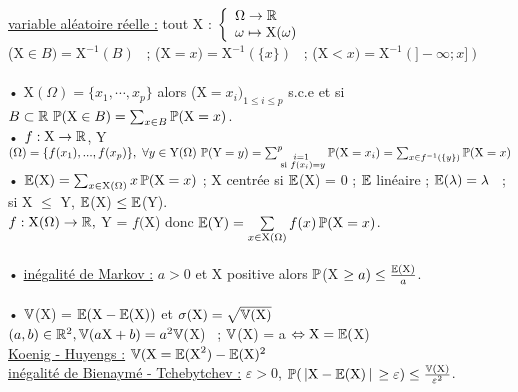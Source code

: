 \documentclass[12 pt]{exampleclass}
\begin{document}
\begin{flushleft}
\begin{doublespace}

	\underline{variable aléatoire réelle :} tout X : $\left\{\begin{array}{ll} \Omega \rightarrow \mathbb{R} \\ \omega \mapsto \text{X}(\omega) \end{array} \right.$\\
	(X$\in B ) = \text{X}^{-1}(B)$ \ ; (X$ = x) = \text{X}^{- 1}(\{x\})$ \ ; (X$ < x) = \text{X}^{- 1} (] - \infty ; x])$\\
	\text{ }\\
	• X$(\Omega) = \{ x_1,\cdots, x_p\}$ alors (X$ = x_i)_{1\leq i \leq p}$ s.c.e et si $B\subset \mathbb{R} \ \mathbb{P}(\text{X}\in B) = \sum_{x\in B} \mathbb{P}(\text{X} = x)$.\\
	• $f : \text{X} \rightarrow \mathbb{R}$, Y$(\Omega) = \{ f(x_1),..., f(x_p)\}, \ \forall y\in \text{Y}(\Omega) \ \mathbb{P}(\text{Y} = y) = \sum_{\begin{subarray}{l} \text{\quad \  \ } i = 1 \\ \text{ si } f(x_i) =y \end{subarray}}^p \mathbb{P}(\text{X} = x_i) = \sum_{x\in f^{- 1}(\{y\})} \mathbb{P}(\text{X} = x)$\\
	• $\mathbb{E}(\text{X}) = \sum_{x\in \text{X}(\Omega)} x \, \mathbb{P}(\text{X} = x)$ ; X centrée si $\mathbb{E}$(X) = 0 ; $\mathbb{E}$ linéaire ; $\mathbb{E}(\lambda) = \lambda$ \ ; si X $\leq$ Y, $\mathbb{E}$(X) $\leq \mathbb{E}$(Y).\\
	$f : \text{X}(\Omega) \rightarrow \mathbb{R},$ Y = $f($X) donc $\mathbb{E}(\text{Y}) = \sum\limits_{x\in \text{X}(\Omega)} f(x) \, \mathbb{P}(\text{X} = x)$.\\
	
	\text{ }\\
	• \underline{inégalité de Markov :} $a>0$ et X positive alors $\mathbb{P}$(X $\geq a) \leq \frac{\mathbb{E}(\text{X})}{a}$.\\
	
	\text{ }\\
	• $\mathbb{V}$(X) = $\mathbb{E} \text{(X} - \mathbb{E}(\text{X}))$ et $\sigma(\text{X}) = \sqrt{\mathbb{V}(\text{X})}$\\
	$(a,b)\in\mathbb{R}^2, \mathbb{V}(a\text{X} +  b) = a^2 \mathbb{V}($X) \ ; $\mathbb{V}$(X) = a $\Leftrightarrow \text{X} = \mathbb{E}($X) \\ \underline{Koenig - Huyengs :} $\mathbb{V}(\text{X} = \mathbb{E}(\text{X}^2) - \mathbb{E}(\text{X})^2$ \\
	\underline{inégalité de Bienaymé - Tchebytchev :} $\varepsilon > 0$, $\mathbb{P}(\, |\text{X} -\mathbb{E}(\text{X}) \, | \, \geq \varepsilon) \leq \frac{\mathbb{V}(\text{X})}{\varepsilon^2}$.\\
	

\end{doublespace}
\end{flushleft}
\end{document}
